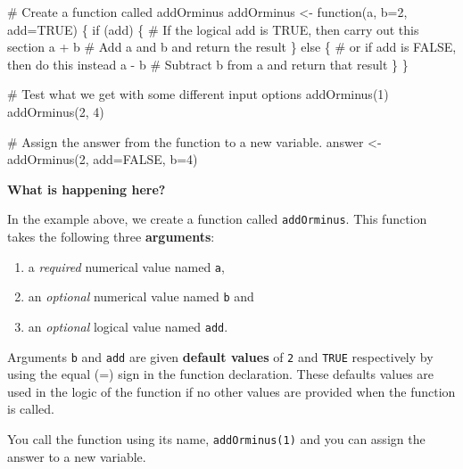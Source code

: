 \documentclass[a4paper]{book}
\newenvironment{Shaded}{}{}
\newcommand{\KeywordTok}[1]{\textcolor[rgb]{0.00,0.00,1.00}{{#1}}}
\newcommand{\DataTypeTok}[1]{{#1}}
\newcommand{\DecValTok}[1]{{#1}}
\newcommand{\StringTok}[1]{\textcolor[rgb]{0.00,0.50,0.50}{{#1}}}
\newcommand{\CommentTok}[1]{\textcolor[rgb]{0.00,0.50,0.00}{{#1}}}
\newcommand{\OtherTok}[1]{\textcolor[rgb]{1.00,0.25,0.00}{{#1}}}
\newcommand{\NormalTok}[1]{{#1}}
\providecommand{\tightlist}{%
  \setlength{\itemsep}{0pt}\setlength{\parskip}{0pt}}
\newlength{\leftbarwidth}
\newlength{\leftbarsep}
\newcommand*{\leftbarcolorcmd}{\color{darkgray}}%
\renewenvironment{leftbar}{%
    \def\FrameCommand{{\leftbarcolorcmd{\vrule width \leftbarwidth\relax\hspace {\leftbarsep}}}}%
    \MakeFramed {\advance \hsize -\width \FrameRestore }%
}{%
    \endMakeFramed
}
\renewenvironment{Shaded}
{\vspace{0em}\begin{leftbar}\begin{snugshade}}
{\end{snugshade}\end{leftbar}\vspace{0pt}}
\begin{document}
\begin{Shaded}
\begin{Highlighting}[]
\CommentTok{# Create a function called addOrminus}
\NormalTok{addOrminus <-}\StringTok{ }\NormalTok{function(a, }\DataTypeTok{b=}\DecValTok{2}\NormalTok{, }\DataTypeTok{add=}\OtherTok{TRUE}\NormalTok{) \{}
  \NormalTok{if (add) \{  }\CommentTok{# If the logical add is TRUE, then carry out this section}
    \NormalTok{a +}\StringTok{ }\NormalTok{b     }\CommentTok{# Add a and b and return the result}
  \NormalTok{\} else \{    }\CommentTok{# or if add is FALSE, then do this instead}
    \NormalTok{a -}\StringTok{ }\NormalTok{b     }\CommentTok{# Subtract b from a and return that result}
  \NormalTok{\}}
\NormalTok{\}}

\CommentTok{# Test what we get with some different input options}
\KeywordTok{addOrminus}\NormalTok{(}\DecValTok{1}\NormalTok{)}
\KeywordTok{addOrminus}\NormalTok{(}\DecValTok{2}\NormalTok{, }\DecValTok{4}\NormalTok{)}

\CommentTok{# Assign the answer from the function to a new variable.}
\NormalTok{answer <-}\StringTok{ }\KeywordTok{addOrminus}\NormalTok{(}\DecValTok{2}\NormalTok{, }\DataTypeTok{add=}\OtherTok{FALSE}\NormalTok{, }\DataTypeTok{b=}\DecValTok{4}\NormalTok{)}
\end{Highlighting}
\end{Shaded}

\textbf{What is happening here?}

In the example above, we create a function called \texttt{addOrminus}.
This function takes the following three \textbf{arguments}:

\begin{enumerate}
\def\labelenumi{(\roman{enumi})}
\tightlist
\item
  a \emph{required} numerical value named \texttt{a},
\item
  an \emph{optional} numerical value named \texttt{b} and
\item
  an \emph{optional} logical value named \texttt{add}.
\end{enumerate}

Arguments \texttt{b} and \texttt{add} are given \textbf{default values}
of \texttt{2} and \texttt{TRUE} respectively by using the equal (=) sign
in the function declaration. These defaults values are used in the logic
of the function if no other values are provided when the function is
called.

You call the function using its name, \texttt{addOrminus(1)} and you can
assign the answer to a new variable.
\end{document}
